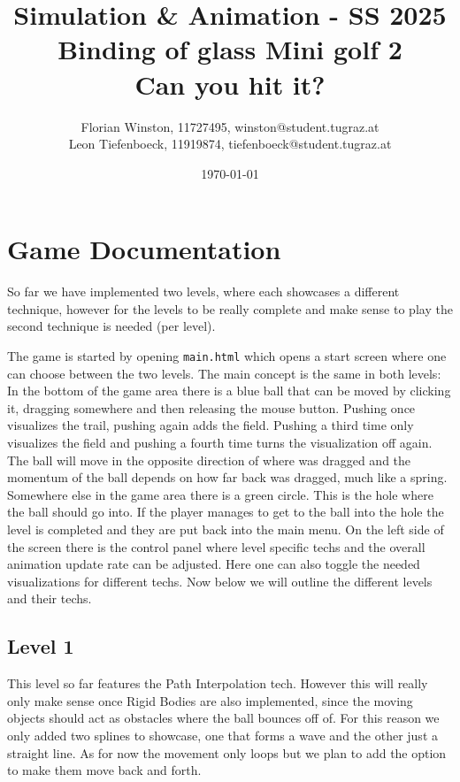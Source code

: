 \documentclass{article}
\title{	
	\large Simulation \& Animation - SS 2025\\
	\Huge{Binding of glass Mini golf 2}\\
	\huge{Can you hit it?}
}
\author{\parbox{\textwidth}{\centering
	Florian Winston, 11727495, winston@student.tugraz.at\\%
	Leon Tiefenboeck, 11919874, tiefenboeck@student.tugraz.at\\%
}}
\date{\today}
\begin{document}
\maketitle

\section{Game Documentation}

So far we have implemented two levels, where each showcases 
a different technique, however for the levels to be really complete and make sense to play the 
second technique is needed (per level). 

The game is started by opening \texttt{main.html} which opens a 
start screen where one can choose between the two levels. 
The main concept is the same in both levels: 
In the bottom of the game area there is a blue ball that can be moved 
by clicking it, dragging somewhere and then releasing the mouse button. Pushing once visualizes the trail, pushing again adds the field. Pushing a third time only visualizes the field and pushing a fourth time turns the visualization off again. 
The ball will move in the opposite direction of where was dragged and the momentum of the 
ball depends on how far back was dragged, much like a spring. 
Somewhere else in the game area there is a green circle. This is the hole where 
the ball should go into. If the player manages to get to the ball into the hole the level is completed 
and they are put back into the main menu. 
On the left side of the screen there is the control panel where level specific techs 
and the overall animation update rate can be adjusted. Here one can also toggle the needed visualizations 
for different techs. Now below we will outline the different levels and their techs. 

\subsection{Level 1}

This level so far features the Path Interpolation tech. However this will really only make sense 
once Rigid Bodies are also implemented, since the moving objects should act as obstacles where the 
ball bounces off of. For this reason we only added two splines to showcase, one that forms a wave and the other
just a straight line. As for now the movement only loops but we plan to add the option to 
make them move back and forth. 
\end{document}
